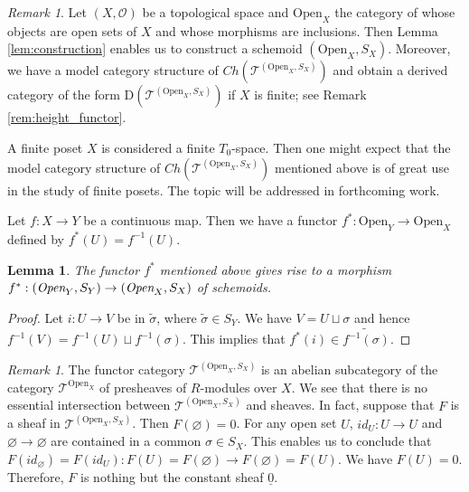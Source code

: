 \documentclass{amsart}
\newtheorem{lem}[thm]{Lemma}
\theoremstyle{definition}
\theoremstyle{remark}
\newtheorem{rem}[thm]{Remark}
\newcommand{\K}{R}%
\newcommand{\T}{{\mathcal T}}
\begin{document}
\begin{rem}
Let $(X, {\mathcal O})$ be a topological space and $\text{Open}_X$  the category of whose objects are open sets of $X$ and 
whose morphisms are inclusions. Then Lemma \ref{lem:construction} enables us to construct a schemoid $(\text{Open}_X, S_X)$. 
Moreover, we have a model category structure of $Ch(\T^{(\text{Open}_X, S_X)})$ 
and obtain a derived category of the form $\text{D}(\T^{(\text{Open}_X, S_X)})$ if $X$ is finite; see Remark \ref{rem:height_functor}. 
\end{rem}

A finite poset $X$ is considered a finite $T_0$-space. Then one might expect that the model category structure of 
$Ch(\T^{(\text{Open}_X, S_X)})$ mentioned above is of great use in the study of finite posets. The topic will be addressed 
in forthcoming work.   

Let $f : X \to Y$ be a continuous map. Then we have a functor $f^* : \text{Open}_Y \to \text{Open}_X$ defined by $f^*(U) = f^{-1}(U)$. 

\begin{lem} The functor $f^*$ mentioned above gives rise to a morphism $f^* : (\text{\em Open}_Y, S_Y) \to (\text{\em Open}_X, S_X)$ of schemoids. 
\end{lem}

\begin{proof} Let $i : U \to V$ be in $\widetilde{\sigma}$, where $\widetilde{\sigma} \in S_Y$. 
We have  $V = U\sqcup \sigma$ and hence $f^{-1}(V) = f^{-1}(U) \sqcup f^{-1}(\sigma)$. This implies that 
$f^*(i) \in \widetilde{f^{-1}(\sigma)}$. 
\end{proof}

\begin{rem}
The functor category $\T^{(\text{Open}_X, S_X)}$ is an abelian subcategory of the category $\T^{\text{Open}_X}$ of presheaves of $\K$-modules over $X$. We see that there is no essential intersection between $\T^{(\text{Open}_X, S_X)}$ and sheaves. In fact, 
suppose that $F$ is a sheaf in $\T^{(\text{Open}_X, S_X)}$. Then $F(\varnothing) = 0$. For any open set $U$, $id_U : U \to U$ and 
$\varnothing \to \varnothing$ are contained in a common $\sigma \in S_X$. This enables us to conclude that 
$F(id_\varnothing) = F(id_U) : F(U) = F(\varnothing) \to F(\varnothing) = F(U)$. We have $F(U) =0$. Therefore, $F$ is nothing but the constant sheaf $\underline{0}$. 
\end{rem}
\end{document}
